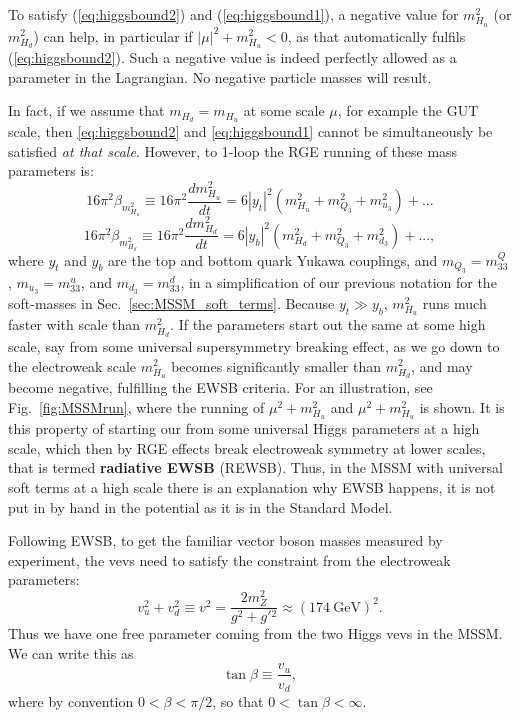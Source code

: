 \documentclass[notes.tex]{subfiles}
\begin{document}
To satisfy (\ref{eq:higgsbound2}) and (\ref{eq:higgsbound1}),  a negative value for $m_{H_u}^2$ (or $m_{H_d}^2$) can help, in particular if $|\mu|^2+m_{H_u}^2<0$, as that automatically fulfils (\ref{eq:higgsbound2}). Such a negative value is indeed perfectly allowed as a parameter in the Lagrangian. No negative particle masses will result. 

In fact, if we assume that $m_{H_d} = m_{H_u}$ at some scale  $\mu$, for example the GUT scale, then \eqref{eq:higgsbound2} and \eqref{eq:higgsbound1} cannot be simultaneously be satisfied {\it at that scale}. However, to 1-loop the RGE running of these mass parameters is:
\[16\pi^2 \beta_{m_{H_u}^2} \equiv 16\pi^2 \frac{dm_{H_u}^2}{dt} = 6|y_t|^2(m_{H_u}^2 + m_{Q_3}^2 + m_{u_3}^2) + ...\]
\[16\pi^2 \beta_{m_{H_d}^2} \equiv 16\pi^2 \frac{dm_{H_d}^2}{dt} = 6|y_b|^2(m_{H_d}^2 + m_{Q_3}^2 + m_{d_3}^2) + ...,\]
where $y_t$ and $y_b$ are the top and bottom quark Yukawa couplings, and $m_{Q_3} = m_{33}^Q$, $m_{u_3}  = m_{33}^u$, and $m_{d_3} = m_{33}^d$, in a simplification of our previous notation for the soft-masses in Sec.~\ref{sec:MSSM_soft_terms}. Because $y_t\gg y_b$, $m_{H_u}^2$ runs much faster with scale than $m_{H_d}^2$. If the parameters start out the same at some high scale, say from some universal supersymmetry breaking effect,  as we go down to the electroweak scale  $m_{H_u}^2$ becomes significantly smaller than  $m_{H_d}^2$, and may become negative, fulfilling the EWSB criteria. For an illustration, see Fig.~\ref{fig:MSSMrun}, where the running of  $\mu^2+m_{H_u}^2$ and  $\mu^2+m_{H_u}^2$ is shown.
It is this property of starting our from some universal Higgs parameters at a high scale, which then by RGE effects break electroweak symmetry at lower scales, that is termed {\bf radiative EWSB} (REWSB). Thus, in the MSSM with universal soft terms at a high scale there is an explanation why EWSB happens, it is not put in by hand in the potential as it is in the Standard Model.


Following EWSB, to get the familiar vector boson masses measured by experiment, the vevs need to satisfy the constraint from the electroweak parameters:
\begin{equation}
v_u^2 + v_d^2 \equiv v^2 = \frac{2m_{Z}^2}{g^2 + g'{}^2} \approx (174~\text{GeV})^2.
\label{eq:Zmass_vev_condition}
\end{equation}
Thus we have one free parameter coming from the two Higgs vevs in the MSSM. We can write this as 
\[\tan\beta \equiv \frac{v_u}{v_d},\]
where by convention $0<\beta<\pi/2$, so that $0<\tan\beta<\infty$. 
\end{document}
